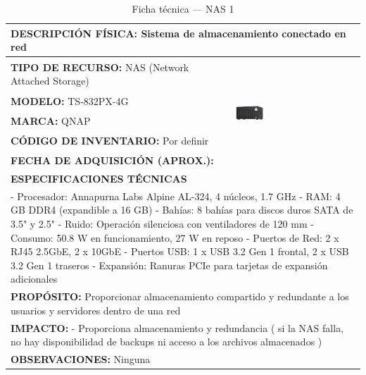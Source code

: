 \begin{table}[H]
\centering
\caption{Ficha técnica --- NAS 1}\label{tab:nas-1}
\begin{tabular}{|p{}|p{}|}
\hline
\multicolumn{2}{|l|}{\textbf{DESCRIPCIÓN FÍSICA:} Sistema de almacenamiento conectado en red} \\ \hline
\textbf{TIPO DE RECURSO:} NAS (Network Attached Storage) & 
\multirow{5}{*}{\includegraphics[width=0.25\textwidth,height=4cm,keepaspectratio]{tablas-images/cp1/NAS/nas-1.png}} \\ \cline{1-1}
\textbf{MODELO:} TS-832PX-4G & \\ \cline{1-1}
\textbf{MARCA:} QNAP & \\ \cline{1-1}
\textbf{CÓDIGO DE INVENTARIO:} Por definir & \\ \cline{1-1}
\textbf{FECHA DE ADQUISICIÓN (APROX.):} & \\ \hline
\multicolumn{2}{|l|}{\textbf{ESPECIFICACIONES TÉCNICAS}} \\ \hline
\multicolumn{2}{|p{0.95\textwidth}|}{
\footnotesize
- Procesador: Annapurna Labs Alpine AL-324, 4 núcleos, 1.7 GHz
- RAM: 4 GB DDR4 (expandible a 16 GB)
- Bahías: 8 bahías para discos duros SATA de 3.5" y 2.5"
- Ruido: Operación silenciosa con ventiladores de 120 mm
- Consumo: 50.8 W en funcionamiento, 27 W en reposo
- Puertos de Red: 2 x RJ45 2.5GbE, 2 x 10GbE
- Puertos USB: 1 x USB 3.2 Gen 1 frontal, 2 x USB 3.2 Gen 1 traseros
- Expansión: Ranuras PCIe para tarjetas de expansión adicionales
} \\ \hline
\multicolumn{2}{|p{0.9\textwidth}|}{\textbf{PROPÓSITO:} Proporcionar almacenamiento compartido y redundante a los usuarios y servidores dentro de una red} \\ \hline
\multicolumn{2}{|p{0.9\textwidth}|}{\textbf{IMPACTO:} - Proporciona almacenamiento y redundancia ( si la NAS falla, no hay disponibilidad de backups 
ni acceso a los archivos almacenados )} \\ \hline
\multicolumn{2}{|l|}{\textbf{OBSERVACIONES:} Ninguna} \\ \hline
\end{tabular}
\end{table}

